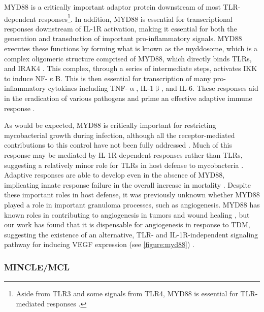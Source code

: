 MYD88 is a critically important adaptor protein downstream of most TLR\hyp{}dependent responses\footnote{Aside from TLR3 and some signals from TLR4, MYD88 is essential for TLR\hyp{}mediated responses \citep{Takeda2004, Kawasaki2014}.}. In addition, MYD88 is essential for transcriptional responses downstream of IL\hyp{}1R activation, making it essential for both the generation and transduction of important pro\hyp{}inflammatory signals. MYD88 executes these functions by forming what is known as the myddosome, which is a complex oligomeric structure comprised of MYD88, which directly binds TLRs, and IRAK4 \citep{Latty2018}. This complex, through a series of intermediate steps, activates IKK to induce NF\hyp{}$\upkappa$B. This is then essential for transcription of many pro\hyp{}inflammatory cytokines including TNF\hyp{}$\upalpha$, IL\hyp{}1$\upbeta$, and IL\hyp{}6. These responses aid in the eradication of various pathogens and prime an effective adaptive immune response \citep{Balka2019}. 

As would be expected, MYD88 is critically important for restricting mycobacterial growth during infection, although all the receptor\hyp{}mediated contributions to this control have not been fully addressed \citep{Berod2014, Shi2003, Scanga2004, Holscher2008, Sugawara2003, Cervantes2017, Underhill1999, Hosseini2021}. Much of this response may be mediated by IL\hyp{}1R\hyp{}dependent responses rather than TLRs, suggesting a relatively minor role for TLRs in host defense to mycobacteria \citep{Fremond2007, Holscher2008, Cambier2014b}. Adaptive responses are able to develop even in the absence of MYD88, implicating innate response failure in the overall increase in mortality \citep{Fremond2004}. Despite these important roles in host defense, it was previously unknown whether MYD88 played a role in important granuloma processes, such as angiogenesis. MYD88 has known roles in contributing to angiogenesis in tumors and wound healing \citep{Macedo2007, Zhang2020b}, but our work has found that it is dispensable for angiogenesis in response to TDM, suggesting the existence of an alternative, TLR\hyp{} and IL\hyp{}1R\hyp{}independent signaling pathway for inducing VEGF expression (see \autoref{figure:myd88}) \citep{Walton2018}.

\subsubsection{MINCLE/MCL}

